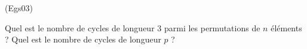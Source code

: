 \begin{tiny}(Egs03)\end{tiny}
Quel est le nombre de cycles de longueur 3 parmi les permutations de $n$ éléments ? Quel est le nombre de cycles de longueur $p$ ?